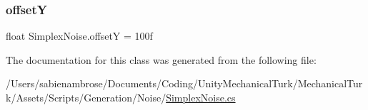 \subsubsection{\texorpdfstring{offsetY}{offsetY}}
{\footnotesize\ttfamily float Simplex\+Noise.\+offsetY = 100f}



The documentation for this class was generated from the following file\+:\begin{DoxyCompactItemize}
\item 
/\+Users/sabienambrose/\+Documents/\+Coding/\+Unity\+Mechanical\+Turk/\+Mechanical\+Turk/\+Assets/\+Scripts/\+Generation/\+Noise/\mbox{\hyperlink{_simplex_noise_8cs}{Simplex\+Noise.\+cs}}\end{DoxyCompactItemize}

